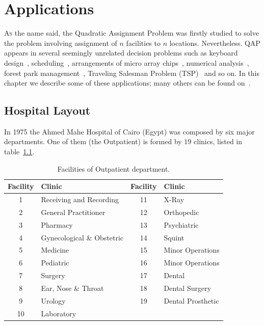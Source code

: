 \chapter{Applications}
\label{chap:Applications}


\lettrine[lines=4,slope=0.6em,findent=-1em]{\color{BrickRed}A}{s} the name said, the Quadratic Assignment Problem was firstly studied to solve the  problem involving  assignment of $n$ facilities to $n$ locations. Nevertheless. QAP appears in several seemingly unrelated decision problems such as keyboard design~\cite{Burkard1977}, scheduling~\cite{Geoffrion1976}, arrangements of micro array chips~\cite{CarvalhoJr2006}, numerical analysis~\cite{Brusco2000}, forest park management~\cite{Bos1993}, Traveling Salesman Problem (TSP)~\cite{Sahni_1976,Cela1998} and so on. In this chapter we describe some of these applications; many others can be found on~\cite{Burkard2012}.

\section{Hospital Layout}
\label{sec:Hospital Layout}
In 1975 the Ahmed Mahe Hospital of Cairo (Egypt) was composed by six major departments. One of them (the Outpatient) is formed by $19$ clinics, listed in table~\ref{tab:Elshafei}.

\begin{table}%
\centering
\caption{Facilities of Outpatient department.}
\label{tab:Elshafei}
\begin{tabular}{*2{cl}}
	\toprule
Facility & Clinic & Facility & Clinic \\
\midrule	
1 & Receiving and Recording& 11 & X-Ray \\
2 & General Practitioner & 12 & Orthopedic\\
3 & Pharmacy & 13 & Psychiatric \\
4 &Gynecological \& Obstetric & 14 & Squint \\
5 & Medicine& 15 & Minor Operations \\
6 & Pediatric & 16 & Minor Operations\\
7 & Surgery & 17 & Dental\\
8 & Ear, Nose \& Throat & 18 & Dental Surgery\\
9 & Urology & 19 & Dental Prosthetic\\
10 & Laboratory & &  \\ 
\bottomrule

\end{tabular}	
\end{table}

